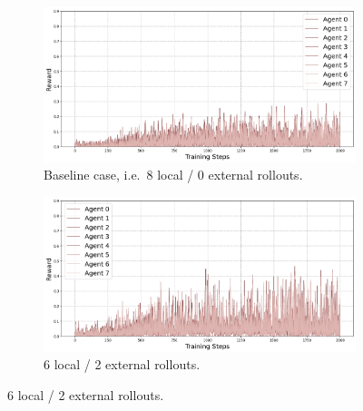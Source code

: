 \documentclass[11pt, a4paper, logo, singlecolumn, copyright]{gensyn}
\begin{document}
\begin{figure}[ht]
    \centering
    
    \begin{subfigure}{0.49\textwidth}
        \centering
        \includegraphics[width=\linewidth]{figures/SAPO_rewards_8loc0ext_gensyn.png}
        \caption{Baseline case, i.e.~8 local / 0 external rollouts.}
        \label{fig:raw_rewards80}
    \end{subfigure}
    \hfill
    \begin{subfigure}{0.49\textwidth}
        \centering
        \includegraphics[width=\linewidth]{figures/SAPO_rewards_6loc2ext_gensyn.png}
        \caption{6 local / 2 external rollouts.}
        \label{fig:raw_rewards62}
    \end{subfigure}
    

\end{figure}
\end{document}
